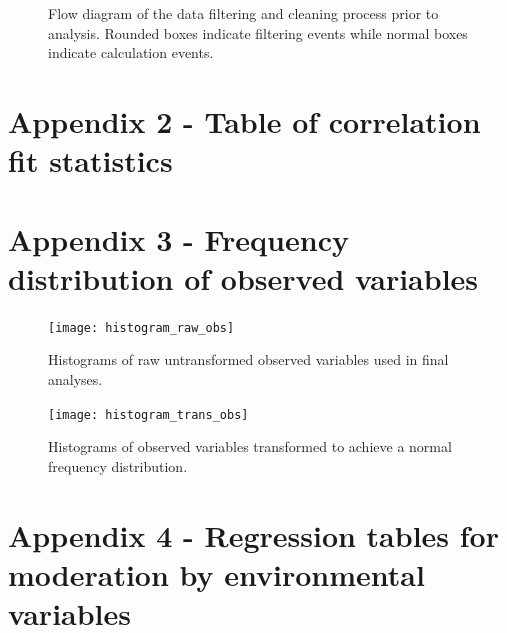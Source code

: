 \documentclass[11pt,a4paper]{article}
\begin{document}
\begin{figure}[H]
\centering
	
	\caption{Flow diagram of the data filtering and cleaning process prior to analysis. Rounded boxes indicate filtering events while normal boxes indicate calculation events.}
	\label{data_clean_flow}
\end{figure}

\section*{Appendix 2 - Table of correlation fit statistics}



\section*{Appendix 3 - Frequency distribution of observed variables}

\begin{figure}[H]
\centering
	\texttt{[image: histogram\_raw\_obs]}
	\caption{Histograms of raw untransformed observed variables used in final analyses.}
	\label{histogram_raw_obs}
\end{figure}

\begin{figure}[H]
\centering
	\texttt{[image: histogram\_trans\_obs]}
	\caption{Histograms of observed variables transformed to achieve a normal frequency distribution.}
	\label{histogram_trans_obs}
\end{figure}

\section*{Appendix 4 - Regression tables for moderation by environmental variables}




\end{document}
